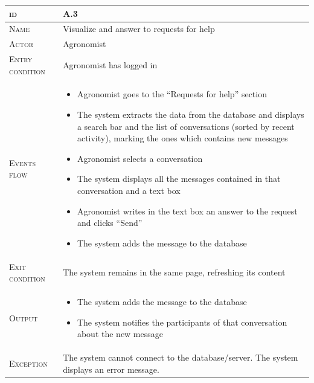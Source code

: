 \begin{table}[H]
    \centering
    \begin{tabular}[c]{|l|p{}|}
        \hline %
    	\textsc{id}                 &   A.3\\
    	\hline %
    	\textsc{Name}               &   Visualize and answer to requests for help\\
    	\hline %
    	\textsc{Actor}             &   Agronomist\\
    	\hline %
    	\textsc{Entry condition}   &   Agronomist has logged in\\
    	\hline %
    	\textsc{Events flow}         &   %
            	                        \begin{itemize}
                                    	    \item Agronomist goes to the “Requests for help” section
                                    		\item The system extracts the data from the database and displays a search bar and the list of conversations (sorted by recent activity), marking the ones which contains new messages
                                    		\item Agronomist selects a conversation
                                    		\item The system displays all the messages contained in that conversation and a text box
                                    		\item Agronomist writes in the text box an answer to the request and clicks “Send”
                                    		\item The system adds the message to the database
                                        \end{itemize}\\
        \hline %
        \textsc{Exit condition}    &  The system remains in the same page, refreshing its content\\
    	\hline %
    	\textsc{Output}             &  \begin{itemize}
    	    \item The system adds the message to the database
    	    \item The system notifies the participants of that conversation about the new message
    	\end{itemize}\\
    	\hline %
    	\textsc{Exception}         &  The system cannot connect to the database/server. The system displays an error message.\\
    	\hline %
        

\end{tabular}
\end{table}
